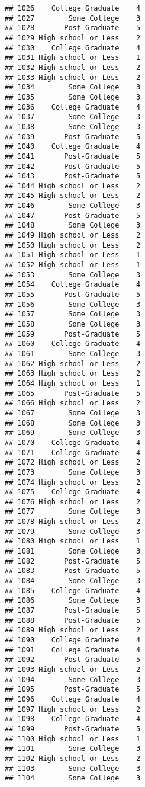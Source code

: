 \documentclass[
]{article}
\begin{document}
\begin{verbatim}
## 1026    College Graduate    4
## 1027        Some College    3
## 1028       Post-Graduate    5
## 1029 High school or Less    2
## 1030    College Graduate    4
## 1031 High school or Less    1
## 1032 High school or Less    2
## 1033 High school or Less    2
## 1034        Some College    3
## 1035        Some College    3
## 1036    College Graduate    4
## 1037        Some College    3
## 1038        Some College    3
## 1039       Post-Graduate    5
## 1040    College Graduate    4
## 1041       Post-Graduate    5
## 1042       Post-Graduate    5
## 1043       Post-Graduate    5
## 1044 High school or Less    2
## 1045 High school or Less    2
## 1046        Some College    3
## 1047       Post-Graduate    5
## 1048        Some College    3
## 1049 High school or Less    2
## 1050 High school or Less    2
## 1051 High school or Less    1
## 1052 High school or Less    1
## 1053        Some College    3
## 1054    College Graduate    4
## 1055       Post-Graduate    5
## 1056        Some College    3
## 1057        Some College    3
## 1058        Some College    3
## 1059       Post-Graduate    5
## 1060    College Graduate    4
## 1061        Some College    3
## 1062 High school or Less    2
## 1063 High school or Less    2
## 1064 High school or Less    1
## 1065       Post-Graduate    5
## 1066 High school or Less    2
## 1067        Some College    3
## 1068        Some College    3
## 1069        Some College    3
## 1070    College Graduate    4
## 1071    College Graduate    4
## 1072 High school or Less    2
## 1073        Some College    3
## 1074 High school or Less    2
## 1075    College Graduate    4
## 1076 High school or Less    2
## 1077        Some College    3
## 1078 High school or Less    2
## 1079        Some College    3
## 1080 High school or Less    1
## 1081        Some College    3
## 1082       Post-Graduate    5
## 1083       Post-Graduate    5
## 1084        Some College    3
## 1085    College Graduate    4
## 1086        Some College    3
## 1087       Post-Graduate    5
## 1088       Post-Graduate    5
## 1089 High school or Less    2
## 1090    College Graduate    4
## 1091    College Graduate    4
## 1092       Post-Graduate    5
## 1093 High school or Less    2
## 1094        Some College    3
## 1095       Post-Graduate    5
## 1096    College Graduate    4
## 1097 High school or Less    2
## 1098    College Graduate    4
## 1099       Post-Graduate    5
## 1100 High school or Less    1
## 1101        Some College    3
## 1102 High school or Less    2
## 1103        Some College    3
## 1104        Some College    3

\end{verbatim}
\end{document}
